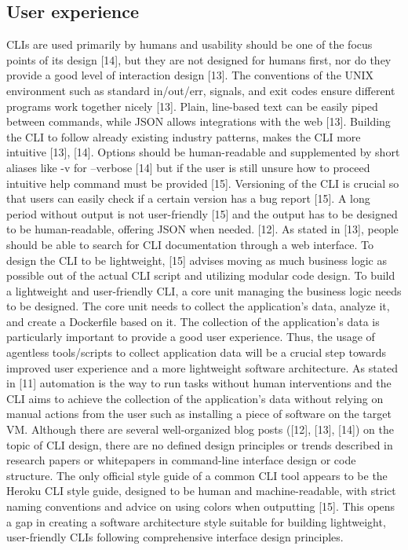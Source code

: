 \documentclass{article}
\begin{document}
\begin{multicols}{2}
\subsection{User experience}
CLIs are used primarily by humans and usability should be one of the focus points of its design [14], but they are not designed for humans first, nor do they provide a good level of interaction design [13]. The conventions of the UNIX environment such as standard in/out/err, signals, and exit codes ensure different programs work together nicely [13]. Plain, line-based text can be easily piped between commands, while JSON allows integrations with the web [13]. Building the CLI to follow already existing industry patterns, makes the CLI more intuitive [13], [14]. Options should be human-readable and supplemented by short aliases like -v for –verbose [14] but if the user is still unsure how to proceed intuitive help command must be provided [15]. Versioning of the CLI is crucial so that users can easily check if a certain version has a bug report [15]. A long period without output is not user-friendly [15] and the output has to be designed to be human-readable, offering JSON when needed. [12]. As stated in [13], people should be able to search for CLI documentation through a web interface. To design the CLI to be lightweight, [15] advises moving as much business logic as possible out of the actual CLI script and utilizing modular code design. To build a lightweight and user-friendly CLI, a core unit managing the business logic needs to be designed. The core unit needs to collect the application’s data, analyze it, and create a Dockerfile based on it. The collection of the application’s data is particularly important to provide a good user experience. Thus, the usage of agentless tools/scripts to collect application data will be a crucial step towards improved user experience and a more lightweight software architecture. As stated in [11] automation is the way to run tasks without human interventions and the CLI aims to achieve the collection of the application’s data without relying on manual actions from the user such as installing a piece of software on the target VM. Although there are several well-organized blog posts ([12], [13], [14]) on the topic of CLI design, there are no defined design principles or trends described in research papers or whitepapers in command-line interface design or code structure. The only official style guide of a common CLI tool appears to be the Heroku CLI style guide, designed to be human and machine-readable, with strict naming conventions and advice on using colors when outputting [15]. This opens a gap in creating a software architecture style suitable for building lightweight, user-friendly CLIs following comprehensive interface design principles.


\end{multicols}
\end{document}
